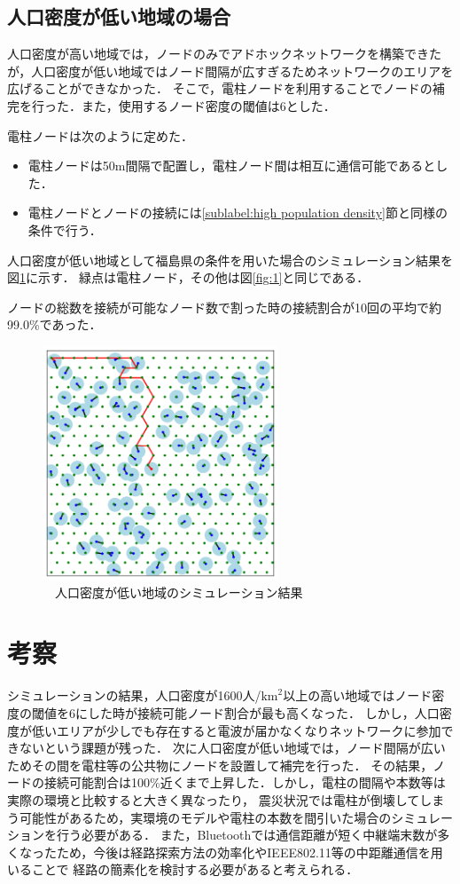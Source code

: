 \documentclass[a4paper, 9pt]{ltjsarticle}
\begin{document}
\subsection{人口密度が低い地域の場合} \label{sublabel:low population density}
人口密度が高い地域では，ノードのみでアドホックネットワークを構築できたが，人口密度が低い地域ではノード間隔が広すぎるためネットワークのエリアを広げることができなかった．
そこで，電柱ノードを利用することでノードの補完を行った．また，使用するノード密度の閾値は6とした．\par
電柱ノードは次のように定めた．

\begin{itemize}
  \item 電柱ノードは50m間隔で配置\cite{電柱設置間隔}し，電柱ノード間は相互に通信可能であるとした．
  \item 電柱ノードとノードの接続には\ref{sublabel:high population density}節と同様の条件で行う．
\end{itemize}

人口密度が低い地域として福島県の条件を用いた場合のシミュレーション結果を図\ref{fig:3}に示す．
緑点は電柱ノード，その他は図\ref{fig:1}と同じである． \par
ノードの総数を接続が可能なノード数で割った時の接続割合が10回の平均で約99.0\%であった．
\begin{figure}[ht]
  \centering
  \includegraphics[width=70mm]{電柱を用いたシミュレーション結果.png}
  \caption{　人口密度が低い地域のシミュレーション結果}
  \label{fig:3}
\end{figure}

\section{考察} \label{label:consideration}
シミュレーションの結果，人口密度が1600人/$\mathrm{km}^2$以上の高い地域ではノード密度の閾値を6にした時が接続可能ノード割合が最も高くなった．
しかし，人口密度が低いエリアが少しでも存在すると電波が届かなくなりネットワークに参加できないという課題が残った．
次に人口密度が低い地域では，ノード間隔が広いためその間を電柱等の公共物にノードを設置して補完を行った．
その結果，ノードの接続可能割合は100\%近くまで上昇した．しかし，電柱の間隔や本数等は実際の環境と比較すると大きく異なったり，
震災状況では電柱が倒壊してしまう可能性があるため，実環境のモデルや電柱の本数を間引いた場合のシミュレーションを行う必要がある．
また，Bluetoothでは通信距離が短く中継端末数が多くなったため，今後は経路探索方法の効率化やIEEE802.11等の中距離通信を用いることで
経路の簡素化を検討する必要があると考えられる．
\end{document}
